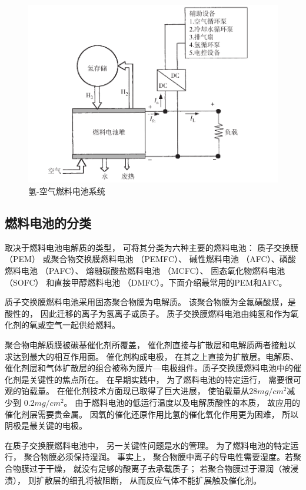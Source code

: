 \documentclass[UTF8,a4paper,11pt]{article}
\begin{document}
\begin{figure}[htbp]
\centering
\includegraphics[scale=0.6]{p4.png}
\caption{氢-空气燃料电池系统}
\end{figure}

\subsection{燃料电池的分类}
取决于燃料电池电解质的类型， 可将其分类为六种主要的燃料电池： 质子交换膜 （PEM） 或聚合物交换膜燃料电池 （PEMFC）、 碱性燃料电池 （AFC）、磷酸燃料电池 （PAFC）、 熔融碳酸盐燃料电池 （MCFC）、 固态氧化物燃料电池（SOFC） 和直接甲醇燃料电池 （DMFC）。下面介绍最常用的PEM和AFC。

质子交换膜燃料电池采用固态聚合物膜为电解质。 该聚合物膜为全氟磺酸膜，是酸性的， 因此迁移的离子为氢离子或质子。 质子交换膜燃料电池由纯氢和作为氧化剂的氧或空气一起供给燃料。

聚合物电解质膜被碳基催化剂所覆盖， 催化剂直接与扩散层和电解质两者接触以求达到最大的相互作用面。 催化剂构成电极， 在其之上直接为扩散层。电解质、 催化剂层和气体扩散层的组合被称为膜片—电极组件。质子交换膜燃料电池中的催化剂是关键性的焦点所在。 在早期实践中， 为了燃料电池的特定运行， 需要很可观的铂载量。 在催化剂技术方面现已取得了巨大进展， 使铂载量从$28mg/cm^2$减少到 $0.2mg/cm^2$。 由于燃料电池的低运行温度以及电解质酸性的本质， 故应用的催化剂层需要贵金属。 因氧的催化还原作用比氢的催化氧化作用更为困难， 所以阴极是最关键的电极。


在质子交换膜燃料电池中， 另一关键性问题是水的管理。 为了燃料电池的特定运行， 聚合物膜必须保持湿润。 事实上， 聚合物膜中离子的导电性需要湿度。若聚合物膜过于干燥， 就没有足够的酸离子去承载质子； 若聚合物膜过于湿润（被浸渍）， 则扩散层的细孔将被阻断， 从而反应气体不能扩展触及催化剂。
\end{document}
